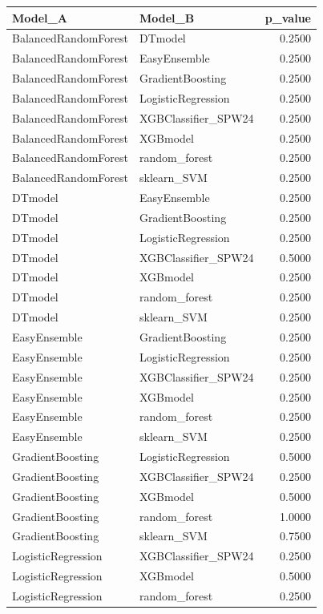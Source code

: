 \begin{table}[t]
\centering
\begin{tabular}{llr}
\toprule
Model_A & Model_B & p_value \\
\midrule
BalancedRandomForest & DTmodel & 0.2500 \\
BalancedRandomForest & EasyEnsemble & 0.2500 \\
BalancedRandomForest & GradientBoosting & 0.2500 \\
BalancedRandomForest & LogisticRegression & 0.2500 \\
BalancedRandomForest & XGBClassifier_SPW24 & 0.2500 \\
BalancedRandomForest & XGBmodel & 0.2500 \\
BalancedRandomForest & random_forest & 0.2500 \\
BalancedRandomForest & sklearn_SVM & 0.2500 \\
DTmodel & EasyEnsemble & 0.2500 \\
DTmodel & GradientBoosting & 0.2500 \\
DTmodel & LogisticRegression & 0.2500 \\
DTmodel & XGBClassifier_SPW24 & 0.5000 \\
DTmodel & XGBmodel & 0.2500 \\
DTmodel & random_forest & 0.2500 \\
DTmodel & sklearn_SVM & 0.2500 \\
EasyEnsemble & GradientBoosting & 0.2500 \\
EasyEnsemble & LogisticRegression & 0.2500 \\
EasyEnsemble & XGBClassifier_SPW24 & 0.2500 \\
EasyEnsemble & XGBmodel & 0.2500 \\
EasyEnsemble & random_forest & 0.2500 \\
EasyEnsemble & sklearn_SVM & 0.2500 \\
GradientBoosting & LogisticRegression & 0.5000 \\
GradientBoosting & XGBClassifier_SPW24 & 0.2500 \\
GradientBoosting & XGBmodel & 0.5000 \\
GradientBoosting & random_forest & 1.0000 \\
GradientBoosting & sklearn_SVM & 0.7500 \\
LogisticRegression & XGBClassifier_SPW24 & 0.2500 \\
LogisticRegression & XGBmodel & 0.5000 \\
LogisticRegression & random_forest & 0.2500 \\

\end{tabular}
\end{table}
